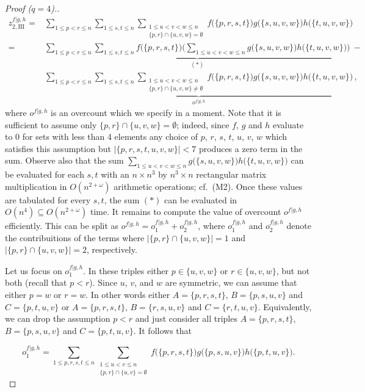 \documentclass{amsart}
\begin{document}
\begin{proof}[Proof ($q=4$).]
\[
\begin{split}
z_{2,\mathrm{III}}^{f|g,h}
=& 
\sum_{1\leq p<r\leq n}
\sum_{1\leq s,t\leq n}
\sum_{\substack{1\leq u<v<w\leq n\\\{p,r\}\cap\{u,v,w\}=\emptyset}}
f\bigl(\{p,r,s,t\}\bigr)
g\bigl(\{s,u,v,w\}\bigr)
h\bigl(\{t,u,v,w\}\bigr)\\
=&
\underbrace{\sum_{1\leq p<r\leq n}
\sum_{1\leq s,t\leq n}
f\bigl(\{p,r,s,t\}\bigr)
\biggl(\sum_{1\leq u<v<w\leq n}
g\bigl(\{s,u,v,w\}\bigr)
h\bigl(\{t,u,v,w\}\bigr)
\biggr)}_{(*)} \ -\\
& 
\underbrace{
\sum_{1\leq p<r\leq n}
\sum_{1\leq s,t\leq n}
\sum_{\substack{1\leq u<v<w\leq n\\\{p,r\}\cap\{u,v,w\}\ne\emptyset}}
f\bigl(\{p,r,s,t\}\bigr)
g\bigl(\{s,u,v,w\}\bigr)
h\bigl(\{t,u,v,w\}\bigr)}_{o^{f|g,h}}\,,
\end{split}
\]
where $o^{f|g,h}$ is an overcount which we specify in a moment.
Note that it is sufficient to assume only $\{p,r\}\cap\{u,v,w\}=\emptyset$; indeed, since $f$, $g$ and $h$ evaluate to $0$ for sets with less than 4 elements any choice of $p$, $r$, $s$, $t$, $u$, $v$, $w$ which satisfies this assumption but $|\{p,r,s,t,u,v,w\}|<7$ produces a zero term in the sum.
Observe also that the sum $\sum_{1\leq u<v<w\leq n}
g\bigl(\{s,u,v,w\}\bigr)
h\bigl(\{t,u,v,w\}\bigr)$ can be evaluated for each $s,t$ 
with an $n\times n^3$ by $n^3\times n$ rectangular matrix multiplication
in $O(n^{2+\omega})$ arithmetic operations; cf.~(M2).
Once these values are tabulated for every $s,t$, the sum $(*)$ can be evaluated in $O(n^4)\subseteq O(n^{2+\omega})$ time.
It remains to compute the value of overcount $o^{f|g,h}$ efficiently.
This can be split as $o^{f|g,h}=o^{f|g,h}_1+o^{f|g,h}_2$, where $o^{f|g,h}_1$ and $o^{f|g,h}_2$ denote the contribuitions of the terms where $|\{p,r\}\cap\{u,v,w\}|=1$ and $|\{p,r\}\cap\{u,v,w\}|=2$, respectively.

Let us focus on $o^{f|g,h}_1$. In these triples either $p\in\{u,v,w\}$ or $r\in\{u,v,w\}$, but not both (recall that $p<r$).
Since $u$, $v$, and $w$ are symmetric, we can assume that either $p=w$ or $r=w$.
In other words either $A=\{p,r,s,t\}$, $B=\{p,s,u,v\}$ and $C=\{p,t,u,v\}$ or $A=\{p,r,s,t\}$, $B=\{r,s,u,v\}$ and $C=\{r,t,u,v\}$.
Equivalently, we can drop the assumption $p<r$ and just consider all triples $A=\{p,r,s,t\}$, $B=\{p,s,u,v\}$ and $C=\{p,t,u,v\}$. 
It follows that

\[o^{f|g,h}_1 = \sum_{1\leq p,r,s,t\leq n}
\sum_{\substack{1\leq u<v\leq n\\\{p,r\}\cap\{u,v\}=\emptyset}}
f\bigl(\{p,r,s,t\}\bigr)
g\bigl(\{p,s,u,v\}\bigr)
h\bigl(\{p,t,u,v\}\bigr).\]


\end{proof}
\end{document}

